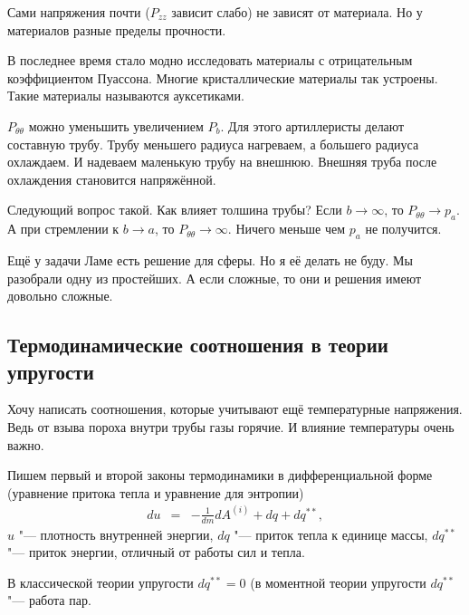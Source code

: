 Сами напряжения почти ($P_{zz}$ зависит слабо) не зависят от материала. Но у материалов разные пределы прочности.

В последнее время стало модно исследовать материалы с отрицательным коэффициентом Пуассона. Многие кристаллические материалы так устроены. Такие материалы называются ауксетиками.

$P_{\theta\theta}$ можно уменьшить увеличением $P_b$. Для этого артиллеристы делают составную трубу. Трубу меньшего радиуса нагреваем, а большего радиуса охлаждаем. И надеваем маленькую трубу на внешнюю. Внешняя труба после охлаждения становится напряжённой.

Следующий вопрос такой. Как влияет толшина трубы? Если $b\to\infty$, то $P_{\theta\theta}\to p_a$. А при стремлении к $b\to a$, то $P_{\theta\theta} \to\infty$.
Ничего меньше чем $p_a$ не получится.

Ещё у задачи Ламе есть решение для сферы. Но я её делать не буду. Мы разобрали одну из простейших. А если сложные, то они и решения имеют довольно сложные.

\subsection{Термодинамические соотношения в теории упругости}
Хочу написать соотношения, которые учитывают ещё температурные напряжения. Ведь от взыва пороха внутри трубы газы горячие. И влияние температуры очень важно.

Пишем первый и второй законы термодинамики в дифференциальной форме (уравнение притока тепла и уравнение для энтропии)
\begin{eqnarray*}
  du &=& -\frac1{dm} d A^{(i)} + dq + dq^{**},
\end{eqnarray*}
$u$ "--- плотность внутренней энергии, $dq$ "--- приток тепла к единице массы, $dq^{**}$ "--- приток энергии, отличный от работы сил и тепла.

В классической теории упругости $dq^{**} =0$ (в моментной теории упругости $dq^{**}$ "--- работа пар.
